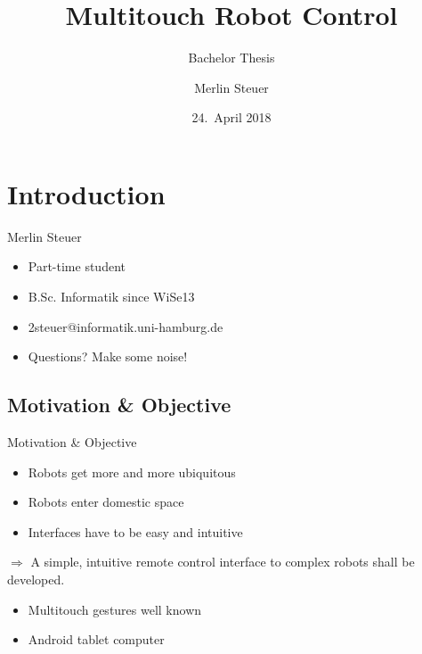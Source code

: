 \documentclass[t]{beamer}
\title		%
  {Multitouch Robot Control}
\subtitle[B.Sc. Thesis]			%
  {Bachelor Thesis}
\author[M.~Steuer]{Merlin Steuer}
\date[24-apr-2018]			%
  {24.~April 2018}
\begin{document}
\frame{\titlepage}

\begin{frame}[allowframebreaks]
  \frametitle{\tocName}
  \tableofcontents
\end{frame}

\section{Introduction}

\begin{frame}{Merlin Steuer}
\begin{itemize}
	\item Part-time student
	\item B.Sc. Informatik since WiSe13
	\item 2steuer@informatik.uni-hamburg.de
	\item Questions? Make some noise!
\end{itemize}
\end{frame}

\subsection{Motivation \& Objective}

\begin{frame}{Motivation \& Objective}
\begin{itemize}
	\item Robots get more and more ubiquitous
	\item Robots enter domestic space\cite{Forlizzi2006}
	\item Interfaces have to be easy and intuitive
\end{itemize}

$\Rightarrow$ A simple, intuitive remote control interface to complex robots shall be developed.

\begin{itemize}
	\item Multitouch gestures well known
	\item Android tablet computer
\end{itemize}
\end{frame}
\end{document}
